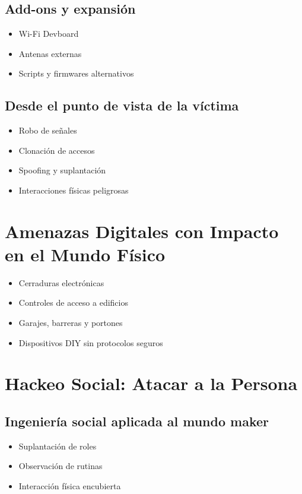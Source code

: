 \documentclass[a4paper,12pt]{article}
\begin{document}
\subsection{Add-ons y expansión}
\begin{itemize}
    \item Wi-Fi Devboard
    \item Antenas externas
    \item Scripts y firmwares alternativos
\end{itemize}

\subsection{Desde el punto de vista de la víctima}
\begin{itemize}
    \item Robo de señales
    \item Clonación de accesos
    \item Spoofing y suplantación
    \item Interacciones físicas peligrosas
\end{itemize}

\section{Amenazas Digitales con Impacto en el Mundo Físico}

\begin{itemize}
    \item Cerraduras electrónicas
    \item Controles de acceso a edificios
    \item Garajes, barreras y portones
    \item Dispositivos DIY sin protocolos seguros
\end{itemize}

\section{Hackeo Social: Atacar a la Persona}

\subsection{Ingeniería social aplicada al mundo maker}
\begin{itemize}
    \item Suplantación de roles
    \item Observación de rutinas
    \item Interacción física encubierta
\end{itemize}
\end{document}
